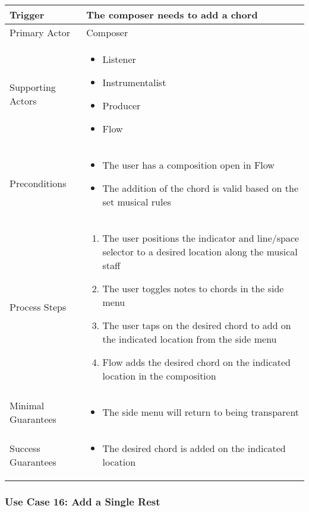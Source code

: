 \begin{tabularx}{\textwidth}{|X|X|}
\hline
Trigger & The composer needs to add a chord \\
\hline
Primary Actor & 
Composer \\
\hline
Supporting Actors & 
\begin{itemize}
\item Listener
\item Instrumentalist
\item Producer
\item Flow
\end{itemize} \\
\hline
Preconditions & 
\begin{itemize}
\item The user has a composition open in Flow 
\item The addition of the chord is valid based on the set musical rules
\end{itemize} \\
\hline
Process Steps & 
\begin{enumerate}
\item The user positions the indicator and line/space selector to a desired location along the musical staff
\item The user toggles notes to chords in the side menu
\item The user taps on the desired chord to add on the indicated location from the side menu
\item Flow adds the desired chord on the indicated location in the composition
\end{enumerate} \\
\hline
Minimal Guarantees & 
\begin{itemize}
  \item The side menu will return to being transparent
\end{itemize} \\
\hline
Success Guarantees & 
\begin{itemize}
\item The desired chord is added on the indicated location
\end{itemize} \\
\hline
\end{tabularx}

\subsubsection{Use Case 16: Add a Single Rest}

